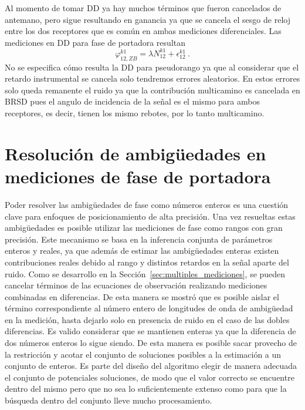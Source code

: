 \documentclass[a4paper,12pt,oneside,onecolumn,final,openright]{book}%
\begin{document}
	Al momento de tomar DD ya hay muchos términos que fueron cancelados de antemano, pero sigue resultando en ganancia ya que se cancela el sesgo de reloj entre los dos receptores que es común en ambas mediciones diferenciales. Las mediciones en DD para fase de portadora resultan
\begin{equation}
	\varphi_{12,ZB}^{k1} = \lambda N_{12}^{k1} + \epsilon_{12}^{k1} \ .
\end{equation}
	No se especifica cómo resulta la DD para pseudorango ya que al considerar que el retardo instrumental se cancela solo tendremos errores aleatorios. En estos errores solo queda remanente el ruido ya que la contribución multicamino es cancelada en BRSD pues el angulo de incidencia de la señal es el mismo para ambos receptores, es decir, tienen los mismo rebotes, por lo tanto multicamino.
\section{Resolución de ambigüedades en mediciones de fase de portadora}\label{sec:amb_res}
	Poder resolver las ambigüedades de fase como números enteros es una cuestión clave para enfoques de posicionamiento de alta precisión. Una vez resueltas estas ambigüedades es posible utilizar las mediciones de fase como rangos con gran precisión. Este mecanismo se basa en la inferencia conjunta de parámetros enteros y reales, ya que además de estimar las ambigüedades enteras existen contribuciones reales debido al rango y distintos retardos en la señal aparte del ruido. Como se desarrollo en la Sección~\ref{sec:multiples_mediciones}, se pueden cancelar términos de las ecuaciones de observación realizando mediciones combinadas en diferencias. De esta manera se mostró que es posible aislar el término correspondiente al número entero de longitudes de onda de ambigüedad en la medición, hasta dejarlo solo en presencia de ruido en el caso de las dobles diferencias. Es valido considerar que se mantienen enteras ya que la diferencia de dos números enteros lo sigue siendo. De esta manera es posible sacar provecho de la restricción y acotar el conjunto de soluciones posibles a la estimación a un conjunto de enteros. Es parte del diseño del algoritmo elegir de manera adecuada el conjunto de potenciales soluciones, de modo que el valor correcto se encuentre dentro del mismo pero que no sea lo suficientemente extenso como para que la búsqueda dentro del conjunto lleve mucho procesamiento.
	
\end{document}
